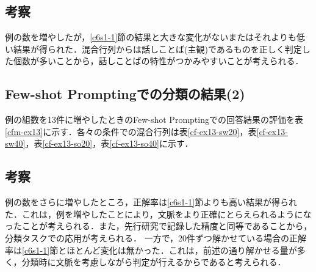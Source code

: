 





\subsection{考察}
例の数を増やしたが，\ref{c6s1-1}節の結果と大きな変化がないまたはそれよりも低い結果が得られた．混合行列からは話しことば(主観)であるものを正しく判定した個数が多いことから，話しことばの特性がつかみやすいことが考えられる．

\subsection{Few-shot Promptingでの分類の結果(2) \label{c6s1-3}}
例の組数を13件に増やしたときのFew-shot Promptingでの回答結果の評価を表\ref{cfm-ex13}に示す．各々の条件での混合行列は表\ref{cf-ex13-sw20}，表\ref{cf-ex13-sw40}，表\ref{cf-ex13-so20}，表\ref{cf-ex13-so40}に示す．







\subsection{考察}
例の数をさらに増やしたところ，正解率は\ref{c6s1-1}節よりも高い結果が得られた．これは，例を増やしたことにより，文脈をより正確にとらえられるようになったことが考えられる．また，先行研究\cite{ai-checker}で記録した精度と同等であることから，分類タスクでの応用が考えられる．
一方で，20件ずつ解かせている場合の正解率は\ref{c6s1-1}節とほとんど変化は無かった．これは，前述の通り解かせる量が多く，分類時に文脈を考慮しながら判定が行えるからであると考えられる．

